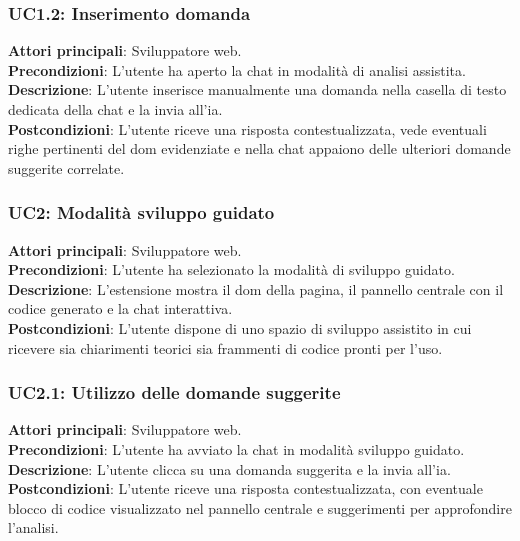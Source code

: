 \subsubsection*{UC1.2: Inserimento domanda}
\noindent \textbf{Attori principali}: Sviluppatore web.\\
\textbf{Precondizioni}: L’utente ha aperto la chat in modalità di analisi assistita.\\
\textbf{Descrizione}: L’utente inserisce manualmente una domanda nella casella di testo dedicata della chat e la invia all'\acrshort{ia}.\\
\textbf{Postcondizioni}: L’utente riceve una risposta contestualizzata, vede eventuali righe pertinenti del \acrshort{dom} evidenziate e nella chat appaiono delle ulteriori domande suggerite correlate.\\


\subsubsection*{UC2: Modalità sviluppo guidato}
\noindent \textbf{Attori principali}: Sviluppatore web.\\
\textbf{Precondizioni}: L’utente ha selezionato la modalità di sviluppo guidato.\\
\textbf{Descrizione}: L’estensione mostra il \acrshort{dom} della pagina, il pannello centrale con il codice generato e la chat interattiva. \\
\textbf{Postcondizioni}: L’utente dispone di uno spazio di sviluppo assistito in cui ricevere sia chiarimenti teorici sia frammenti di codice pronti per l’uso.\\

\subsubsection*{UC2.1: Utilizzo delle domande suggerite}
\noindent \textbf{Attori principali}: Sviluppatore web.\\
\textbf{Precondizioni}: L’utente ha avviato la chat in modalità sviluppo guidato.\\
\textbf{Descrizione}: L’utente clicca su una domanda suggerita e la invia all'\acrshort{ia}.\\
\textbf{Postcondizioni}: L’utente riceve una risposta contestualizzata, con eventuale blocco di codice visualizzato nel pannello centrale e suggerimenti per approfondire l’analisi.\\

